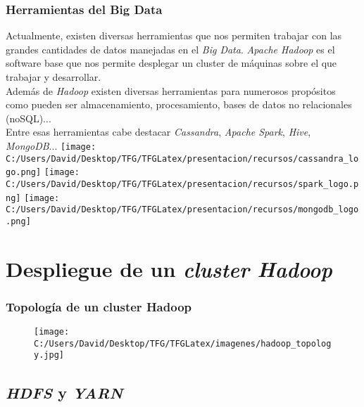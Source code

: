 \documentclass{beamer}
\begin{document}
\begin{frame} %
  \frametitle{Herramientas del Big Data}
  Actualmente, existen diversas herramientas que nos permiten trabajar con las grandes cantidades de datos
  manejadas en el \textit{Big Data}. \textit{Apache Hadoop} es el software base que nos permite desplegar
  un cluster de máquinas sobre el que trabajar y desarrollar.\\
  Además de \textit{Hadoop} existen diversas herramientas para numerosos propósitos como pueden ser almacenamiento,
  procesamiento, bases de datos no relacionales (noSQL)...\\
  Entre esas herramientas cabe destacar \textit{Cassandra}, \textit{Apache Spark}, \textit{Hive}, \textit{MongoDB}...
  \texttt{[image: C:/Users/David/Desktop/TFG/TFGLatex/presentacion/recursos/cassandra\_logo.png]}%
  \texttt{[image: C:/Users/David/Desktop/TFG/TFGLatex/presentacion/recursos/spark\_logo.png]}%
  \texttt{[image: C:/Users/David/Desktop/TFG/TFGLatex/presentacion/recursos/mongodb\_logo.png]}
\end{frame}

\section{Despliegue de un \textit{cluster Hadoop}}

\begin{frame} %
\frametitle{Topología de un cluster Hadoop}
\begin{figure}
\centering
\texttt{[image: C:/Users/David/Desktop/TFG/TFGLatex/imagenes/hadoop\_topology.jpg]}
\end{figure}
\end{frame}


\subsection{\textit{HDFS} y \textit{YARN}}
\end{document}
